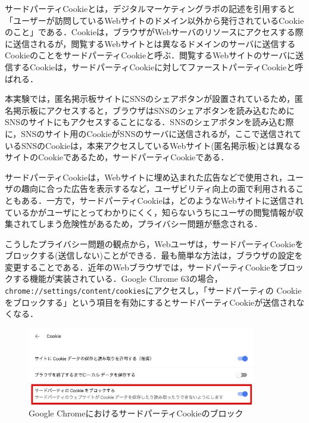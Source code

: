 \documentclass[10pt, a4paper]{jreport}
\begin{document}
サードパーティCookieとは，デジタルマーケティングラボの記述を引用すると「ユーザーが訪問しているWebサイトのドメイン以外から発行されているCookieのこと」である\cite{what_is_third_party_cookie}．Cookieは，ブラウザがWebサーバのリソースにアクセスする際に送信されるが，閲覧するWebサイトとは異なるドメインのサーバに送信するCookieのことをサードパーティCookieと呼ぶ．閲覧するWebサイトのサーバに送信するCookieは，サードパーティCookieに対してファーストパーティCookieと呼ばれる．

本実験では，匿名掲示板サイトにSNSのシェアボタンが設置されているため，匿名掲示板にアクセスすると，ブラウザはSNSのシェアボタンを読み込むためにSNSのサイトにもアクセスすることになる．SNSのシェアボタンを読み込む際に，SNSのサイト用のCookieがSNSのサーバに送信されるが，ここで送信されているSNSのCookieは，本来アクセスしているWebサイト(匿名掲示板)とは異なるサイトのCookieであるため，サードパーティCookieである．

サードパーティCookieは，Webサイトに埋め込まれた広告などで使用され，ユーザの趣向に合った広告を表示するなど，ユーザビリティ向上の面で利用されることもある．一方で，サードパーティCookieは，どのようなWebサイトに送信されているかがユーザにとってわかりにくく，知らないうちにユーザの閲覧情報が収集されてしまう危険性があるため，プライバシー問題が懸念される\cite{third_party_cookie_is_danger}．

こうしたプライバシー問題の観点から，Webユーザは，サードパーティCookieをブロックする(送信しない)ことができる．最も簡単な方法は，ブラウザの設定を変更することである．近年のWebブラウザでは，サードパーティCookieをブロックする機能が実装されている．Google Chrome 63の場合，\verb|chrome://settings/content/cookies|にアクセスし，「サードパーティの Cookie をブロックする」という項目を有効にするとサードパーティCookieが送信されなくなる．

\begin{figure}[H]
	\begin{center}
		\includegraphics[width=100mm]{figures/disable_third_party_cookie_on_chrome.png}
	\end{center}
	\caption{Google ChromeにおけるサードパーティCookieのブロック}
	\label{fig: disable_third_party_cookie_on_chrome}
\end{figure}
\end{document}

